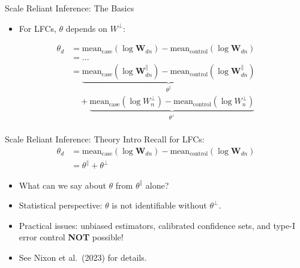 \documentclass[
  ignorenonframetext,
]{beamer}
\providecommand{\tightlist}{%
  \setlength{\itemsep}{0pt}\setlength{\parskip}{0pt}}
\begin{document}
\begin{frame}{Scale Reliant Inference: The Basics}
\protect\hypertarget{scale-reliant-inference-the-basics-1}{}
\begin{itemize}
\tightlist
\item
  For LFCs, \(\theta\) depends on \(W^\perp\):
\end{itemize}

\begin{align*}
\theta_d &= \text{mean}_{\text{case}}(\log \mathbf{W}_{dn}) - \text{mean}_{\text{control}}(\log \mathbf{W}_{dn})\\
&= ... \\
&= \underbrace{\text{mean}_{\text{case}}(\log \mathbf{W}_{dn}^\parallel) - \text{mean}_{\text{control}}(\log \mathbf{W}_{dn}^\parallel)}_{\theta^\parallel}\\
& \, \, \, \, \, \, + \underbrace{\text{mean}_{\text{case}}(\log W_{n}^\perp) - \text{mean}_{\text{control}}(\log W_{n}^\perp)}_{\theta^\perp}\\
\end{align*}
\end{frame}

\begin{frame}{Scale Reliant Inference: Theory Intro}
\protect\hypertarget{scale-reliant-inference-theory-intro}{}
Recall for LFCs: \begin{align*}
\theta_d &= \text{mean}_{\text{case}}(\log \mathbf{W}_{dn} ) - \text{mean}_{\text{control}}(\log \mathbf{W}_{dn} )\\
&= \theta^\parallel + \theta^\perp
\end{align*}

\begin{itemize}
\tightlist
\item
  What can we say about \(\theta\) from \(\theta^\parallel\) alone?
\end{itemize}

\pause

\begin{itemize}
\item
  Statistical perspective: \(\theta\) is not identifiable without
  \(\theta^\perp\).
\item
  Practical issues: unbiased estimators, calibrated confidence sets, and
  type-I error control \textbf{NOT} possible!
\item
  See Nixon et al.~(2023) for details.
\end{itemize}
\end{frame}
\end{document}
